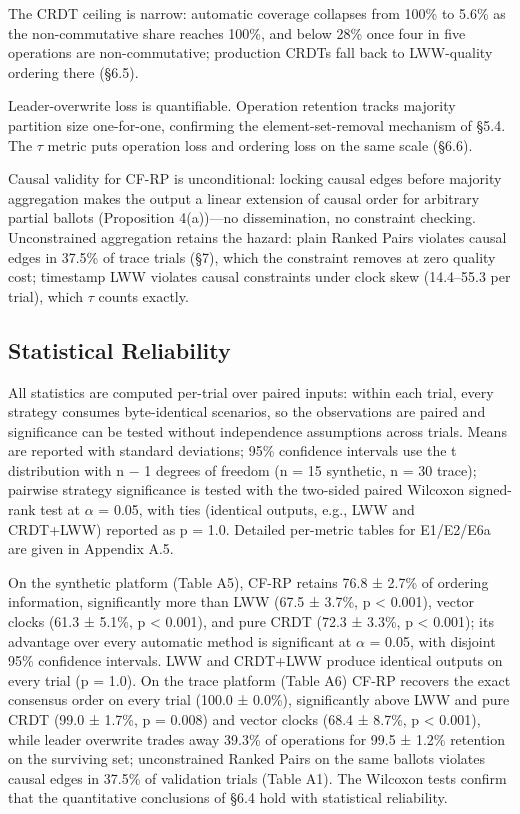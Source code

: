 \documentclass[11pt]{article}
\begin{document}
The CRDT ceiling is narrow: automatic coverage collapses from 100\% to 5.6\% as the non-commutative share reaches 100\%, and below 28\% once four in five operations are non-commutative; production CRDTs fall back to LWW-quality ordering there (§6.5).

Leader-overwrite loss is quantifiable. Operation retention tracks majority partition size one-for-one, confirming the element-set-removal mechanism of §5.4. The $\tau $ metric puts operation loss and ordering loss on the same scale (§6.6).

Causal validity for CF-RP is unconditional: locking causal edges before majority aggregation makes the output a linear extension of causal order for arbitrary partial ballots (Proposition 4(a))—no dissemination, no constraint checking. Unconstrained aggregation retains the hazard: plain Ranked Pairs violates causal edges in 37.5\% of trace trials (§7), which the constraint removes at zero quality cost; timestamp LWW violates causal constraints under clock skew (14.4–55.3 per trial), which $\tau $ counts exactly.

\subsection{Statistical Reliability}
All statistics are computed per-trial over paired inputs: within each trial, every strategy consumes byte-identical scenarios, so the observations are paired and significance can be tested without independence assumptions across trials. Means are reported with standard deviations; 95\% confidence intervals use the t distribution with n $-$ 1 degrees of freedom (n = 15 synthetic, n = 30 trace); pairwise strategy significance is tested with the two-sided paired Wilcoxon signed-rank test at $\alpha $ = 0.05, with ties (identical outputs, e.g., LWW and CRDT+LWW) reported as p = 1.0. Detailed per-metric tables for E1/E2/E6a are given in Appendix A.5.

On the synthetic platform (Table A5), CF-RP retains 76.8 ± 2.7\% of ordering information, significantly more than LWW (67.5 ± 3.7\%, p < 0.001), vector clocks (61.3 ± 5.1\%, p < 0.001), and pure CRDT (72.3 ± 3.3\%, p < 0.001); its advantage over every automatic method is significant at $\alpha $ = 0.05, with disjoint 95\% confidence intervals. LWW and CRDT+LWW produce identical outputs on every trial (p = 1.0). On the trace platform (Table A6) CF-RP recovers the exact consensus order on every trial (100.0 ± 0.0\%), significantly above LWW and pure CRDT (99.0 ± 1.7\%, p = 0.008) and vector clocks (68.4 ± 8.7\%, p < 0.001), while leader overwrite trades away 39.3\% of operations for 99.5 ± 1.2\% retention on the surviving set; unconstrained Ranked Pairs on the same ballots violates causal edges in 37.5\% of validation trials (Table A1). The Wilcoxon tests confirm that the quantitative conclusions of §6.4 hold with statistical reliability.
\end{document}
